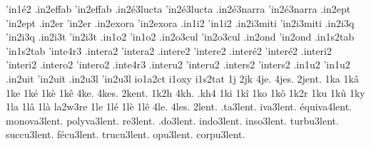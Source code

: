 {                    'in1\'e2
                    .in2effab %
                    'in2effab
                    .in2\'e3lucta
                    'in2\'e3lucta
                    .in2\'e3narra
                    'in2\'e3narra
                    .in2ept
                    'in2ept
                    .in2er
                    'in2er
                    .in2exora %
                    'in2exora
                    .in1i2
                    'in1i2
                    .in2i3miti
                    'in2i3miti
                    .in2i3q
                    'in2i3q
                    .in2i3t
                    'in2i3t
                    .in1o2
                    'in1o2
                    .in2o3cul
                    'in2o3cul
                    .in2ond
                    'in2ond
                    .in1s2tab
                    'in1s2tab
                    'inte4r3
                    .intera2
                    'intera2
                    .intere2
                    'intere2
                    .inter\'e2
                    'inter\'e2
                    .interi2
                    'interi2
                    .intero2
                    'intero2
                    .inte4r3
                    .interu2
                    'interu2
                    .inters2
                    'inters2
                    .in1u2
                    'in1u2
                    .in2uit
                    'in2uit
                    .in2u3l
                    'in2u3l
                    io1a2ct
                    i1oxy
                    i1s2tat
1j
2jk
4je.
4jes.
2jent. %
1ka
1k\^a
1ke
1k\'e
1k\`e
1k\^e
4ke.
4kes.
2kent. %
1k2h
4kh.
.kh4
1ki
1k\^i
1ko
1k\^o
1k2r
1ku
1k\^u
1ky
1la
1l\^a
1l\`a
                    la2w3re
1le
1l\'e
1l\`e
1l\^e
4le.
4les.
        2lent.
     .ta3lent.
     iva3lent.
\'equiva4lent.
  monova3lent.
  polyva3lent.
      re3lent.
     .do3lent.
    indo3lent.
    inso3lent.
   turbu3lent.
   succu3lent.
  f\'ecu3lent.
   trucu3lent.
     opu3lent.
   corpu3lent.
}

